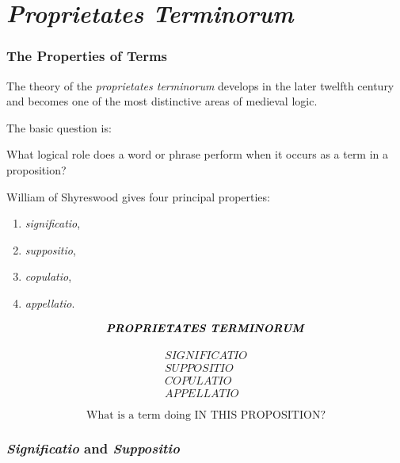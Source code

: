 \documentclass[11pt]{article}
\newcommand{\latin}[1]{\textit{#1}}
\begin{document}
\part{\textit{Proprietates Terminorum}}

\section{The Properties of Terms}

The theory of the \latin{proprietates terminorum} develops in the
later twelfth century and becomes one of the most distinctive
areas of medieval logic.

The basic question is:

\begin{center}
What logical role does a word or phrase perform when it occurs as
a term in a proposition?
\end{center}

William of Shyreswood gives four principal properties:

\begin{enumerate}
    \item \latin{significatio},
    \item \latin{suppositio},
    \item \latin{copulatio},
    \item \latin{appellatio}.
\end{enumerate}

\begin{whiteboard}
\[
\textbf{\latin{PROPRIETATES TERMINORUM}}
\]

\[
\begin{array}{c}
\latin{SIGNIFICATIO}\\
\latin{SUPPOSITIO}\\
\latin{COPULATIO}\\
\latin{APPELLATIO}
\end{array}
\]

\[
\boxed{\text{What is a term doing IN THIS PROPOSITION?}}
\]
\end{whiteboard}

\section{\textit{Significatio} and \textit{Suppositio}}
\end{document}
